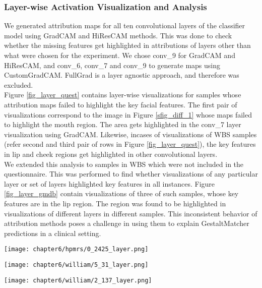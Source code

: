 \documentclass[../report.tex]{subfiles}
\begin{document}
    \subsubsection{Layer-wise Activation Visualization and Analysis}
    We generated attribution maps for all ten convolutional layers of the classifier model using GradCAM and HiResCAM methods. This was done to check whether the missing features get highlighted in attributions of layers other than what were chosen for the experiment. We chose conv\_9 for GradCAM and HiResCAM, and conv\_6, conv\_7 and conv\_9 to generate maps using CustomGradCAM. FullGrad is a layer agnostic approach, and therefore was excluded.\\
	Figure \ref{fig_layer_quest} contains layer-wise visualizations for samples whose attribution maps failed to highlight the key facial features. The first pair of visualizations correspond to the image in Figure \ref{sfig_diff_1} whose maps failed to highlight the mouth region. The area gets highlighted in the conv\_7 layer visualization using GradCAM. Likewise, incases of visualizations of WBS samples (refer second and third pair of rows in Figure \ref{fig_layer_quest}), the key features in lip and cheek regions get highlighted in other convolutional layers.\\
	We extended this analysis to samples in WBS which were not included in the questionnaire. This was performed to find whether visualizations of any particular layer or set of layers highlighted  key features in all instances. Figure \ref{fig_layer_gmdb} contain visualizations of three of such samples, whose key features are in the lip region. The region was found to be highlighted in visualizations of different layers in different samples. This inconsistent behavior of attribution methods poses a challenge in using them to explain GestaltMatcher predictions in a clinical setting.  
    \begin{sidewaysfigure}
    	\texttt{[image: chapter6/hpmrs/0\_2425\_layer.png]}
    	
    	\texttt{[image: chapter6/william/5\_31\_layer.png]}
	      
    	\texttt{[image: chapter6/william/2\_137\_layer.png]}
    	\caption[Example layer-wise activation map visualizations for instances presented in the questionnaire]{Example layer-wise activation map visualizations for instances presented in the questionnaire. Layers highlighting syndromic features are boxed in red.}
	   \label{fig_layer_quest}	
    \end{sidewaysfigure}
\end{document}
